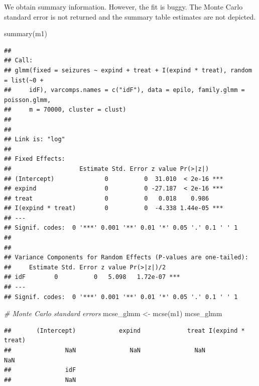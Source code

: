 \documentclass[
  ignorenonframetext,
]{beamer}
\newenvironment{Shaded}{\begin{snugshade}}{\end{snugshade}}
\newcommand{\CommentTok}[1]{\textcolor[rgb]{0.56,0.35,0.01}{\textit{#1}}}
\newcommand{\FunctionTok}[1]{\textcolor[rgb]{0.00,0.00,0.00}{#1}}
\newcommand{\NormalTok}[1]{#1}
\newcommand{\OtherTok}[1]{\textcolor[rgb]{0.56,0.35,0.01}{#1}}
\begin{document}
\begin{frame}[fragile]{}
\protect\hypertarget{section-14}{}
We obtain summary information. However, the fit is buggy. The Monte
Carlo standard error is not returned and the summary table estimates are
not depicted.

\vspace{12pt}
\tiny

\begin{Shaded}
\begin{Highlighting}[]
\FunctionTok{summary}\NormalTok{(m1)}
\end{Highlighting}
\end{Shaded}

\begin{verbatim}
## 
## Call:
## glmm(fixed = seizures ~ expind + treat + I(expind * treat), random = list(~0 + 
##     idF), varcomps.names = c("idF"), data = epilo, family.glmm = poisson.glmm, 
##     m = 70000, cluster = clust)
## 
## 
## Link is: "log"
## 
## Fixed Effects:
##                   Estimate Std. Error z value Pr(>|z|)    
## (Intercept)              0          0  31.010  < 2e-16 ***
## expind                   0          0 -27.187  < 2e-16 ***
## treat                    0          0   0.018    0.986    
## I(expind * treat)        0          0  -4.338 1.44e-05 ***
## ---
## Signif. codes:  0 '***' 0.001 '**' 0.01 '*' 0.05 '.' 0.1 ' ' 1
## 
## 
## Variance Components for Random Effects (P-values are one-tailed):
##     Estimate Std. Error z value Pr(>|z|)/2    
## idF        0          0   5.098   1.72e-07 ***
## ---
## Signif. codes:  0 '***' 0.001 '**' 0.01 '*' 0.05 '.' 0.1 ' ' 1
\end{verbatim}
\end{frame}

\begin{frame}[fragile]{}
\protect\hypertarget{section-15}{}
\tiny

\begin{Shaded}
\begin{Highlighting}[]
\CommentTok{\# Monte Carlo standard errors}
\NormalTok{mcse\_glmm }\OtherTok{\textless{}{-}} \FunctionTok{mcse}\NormalTok{(m1)}
\NormalTok{mcse\_glmm}
\end{Highlighting}
\end{Shaded}

\begin{verbatim}
##       (Intercept)            expind             treat I(expind * treat) 
##               NaN               NaN               NaN               NaN 
##               idF 
##               NaN
\end{verbatim}
\end{frame}
\end{document}
